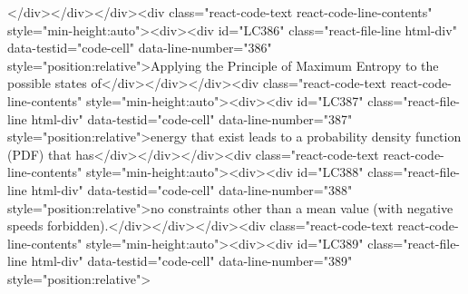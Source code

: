 {{{</div></div></div><div class="react-code-text react-code-line-contents" style="min-height:auto"><div><div id="LC386" class="react-file-line html-div" data-testid="code-cell" data-line-number="386" style="position:relative">Applying the Principle of Maximum Entropy to the possible states of</div></div></div><div class="react-code-text react-code-line-contents" style="min-height:auto"><div><div id="LC387" class="react-file-line html-div" data-testid="code-cell" data-line-number="387" style="position:relative">energy that exist leads to a probability density function (PDF) that has</div></div></div><div class="react-code-text react-code-line-contents" style="min-height:auto"><div><div id="LC388" class="react-file-line html-div" data-testid="code-cell" data-line-number="388" style="position:relative">no constraints other than a mean value (with negative speeds forbidden).</div></div></div><div class="react-code-text react-code-line-contents" style="min-height:auto"><div><div id="LC389" class="react-file-line html-div" data-testid="code-cell" data-line-number="389" style="position:relative">
}}}
